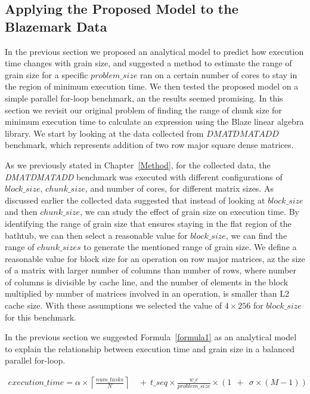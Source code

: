 \subsection{Applying the Proposed Model to the Blazemark Data}
In the previous section we proposed an analytical model to predict how execution time changes with grain size, and suggested a method to estimate the range of grain size for a specific $problem\_{size}$ ran on a certain number of cores to stay in the region of minimum execution time. We then tested the proposed model on a simple parallel for-loop benchmark, an the results seemed promising.
In this section we revisit our original problem of finding the range of chunk size for minimum execution time to calculate an expression using the Blaze linear algebra library. 
We start by looking at the data collected from $DMATDMATADD$ benchmark, which represents addition of two row major square dense matrices.
  
As we previously stated in Chapter~\ref{Method}, for the collected data, the \emph{DMATDMATADD} benchmark was executed with different configurations of $block\_{size}$, $chunk\_{size}$, and number of cores, for different matrix sizes. 
As discussed earlier the collected data suggested that instead of looking at $block\_{size}$ and then $chunk\_{size}$, we can study the effect of grain size on execution time. By identifying the range of grain size that ensures staying in the flat region of the bathtub, we can then select a reasonable value for $block\_{size}$, we can find the range of $chunk\_{sizes}$ to generate the mentioned range of grain size. We define a reasonable value for block size for an operation on row major matrices, az the size of a matrix with larger number of columns than number of rows, where number of columns is divisible by cache line, and the number of elements in the block multiplied by number of matrices involved in an operation, is smaller than L2 cache size. With these assumptions we selected the value of $4\times{256}$ for $block\_{size}$ for this benchmark.

In the previous section we suggested Formula~\ref{formula1} as an analytical model to explain the relationship between execution time and grain size in a balanced parallel for-loop.    

\begin{equation}
\begin{aligned}
execution\_time = 
\alpha\times{\left\lceil{\frac{num\_{tasks}}{N}}\right\rceil}\:\:&+\:\:t\_{seq}\times{\frac{w\_c}{problem\_{size}}}\times{(1\:\:+\:\:\sigma\times{(M-1)})}\:\:\\
\end{aligned}
\end{equation}

